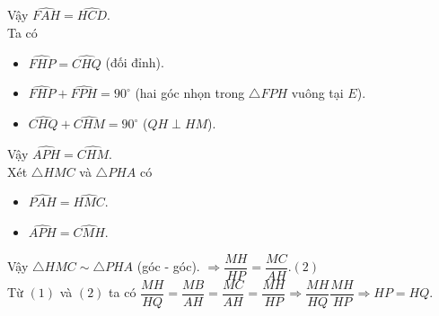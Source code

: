 \begin{ex}
{\begin{enumerate}
\begin{itemize}
			\end{itemize}
			Vậy $\widehat{FAH}=\widehat{HCD}$.\\
			Ta có
			\begin{itemize}
				\item $\widehat{FHP}=\widehat{CHQ}$ (đối đỉnh).
				\item $\widehat{FHP}+\widehat{FPH}=90^\circ$ (hai góc nhọn trong $\triangle FPH$ vuông tại $E$).
				\item $\widehat{CHQ}+\widehat{CHM}=90^\circ$ ($QH\perp HM$).
			\end{itemize}
			Vậy $\widehat{APH}=\widehat{CHM}$.\\
			Xét $\triangle HMC$ và $\triangle PHA$ có
			\begin{itemize}
				\item $\widehat{PAH}=\widehat{HMC}$.
				\item $\widehat{APH}=\widehat{CMH}$.
			\end{itemize}
			Vậy $\triangle HMC\sim\triangle PHA$ (góc - góc). $\Rightarrow \dfrac{MH}{HP}=\dfrac{MC}{AH}$.\hfill$(2)$\\
			Từ $(1)$ và $(2)$ ta có $\dfrac{MH}{HQ}=\dfrac{MB}{AH}=\dfrac{MC}{AH}=\dfrac{MH}{HP}\Rightarrow\dfrac{MH}{HQ}\dfrac{MH}{HP}\Rightarrow HP=HQ$.
			

\end{enumerate}}
\end{ex}
